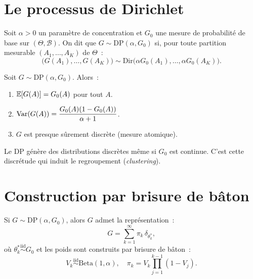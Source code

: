 \section{Le processus de Dirichlet}

\begin{definition}
Soit $\alpha > 0$ un param\`etre de concentration et $G_0$ une mesure de
probabilit\'e de base sur $(\Theta, \mathcal{B})$. On dit que
$G \sim \mathrm{DP}(\alpha, G_0)$ si, pour toute partition mesurable
$(A_1, \ldots, A_K)$ de $\Theta$~:
\[
  \bigl(G(A_1), \ldots, G(A_K)\bigr) \sim
  \mathrm{Dir}\!\bigl(\alpha G_0(A_1), \ldots, \alpha G_0(A_K)\bigr).
\]
\end{definition}

\begin{proposition}[Propri\'et\'es du DP]
Soit $G \sim \mathrm{DP}(\alpha, G_0)$. Alors~:
\begin{enumerate}
  \item $\mathbb{E}[G(A)] = G_0(A)$ pour tout $A$.
  \item $\mathrm{Var}(G(A)) = \dfrac{G_0(A)(1 - G_0(A))}{\alpha + 1}$.
  \item $G$ est presque s\^urement discr\`ete (mesure atomique).
\end{enumerate}
\end{proposition}

\begin{attention}
Le DP g\'en\`ere des distributions discr\`etes m\^eme si $G_0$ est continue.
C'est cette discr\'etude qui induit le regroupement (\emph{clustering}).
\end{attention}

\section{Construction par brisure de b\^aton}

\begin{theoreme}[Sethuraman, 1994]
Si $G \sim \mathrm{DP}(\alpha, G_0)$, alors $G$ admet la repr\'esentation~:
\[
  G = \sum_{k=1}^{\infty} \pi_k \,\delta_{\theta_k^*},
\]
o\`u $\theta_k^* \stackrel{\text{iid}}{\sim} G_0$ et les poids sont
construits par brisure de b\^aton~:
\[
  V_k \stackrel{\text{iid}}{\sim} \mathrm{Beta}(1, \alpha), \quad
  \pi_k = V_k \prod_{j=1}^{k-1}(1 - V_j).
\]
\end{theoreme}

